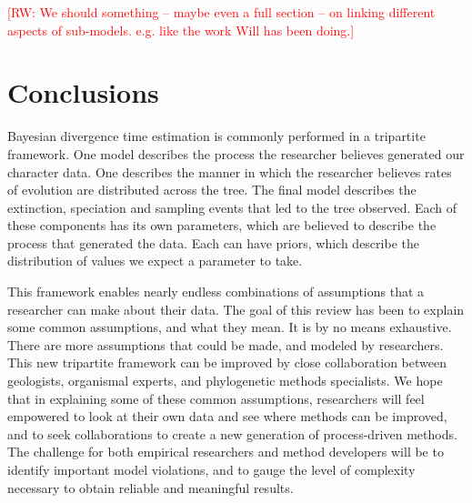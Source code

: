 \documentclass[11pt]{article}
\newcommand{\rw}[1]{{\textcolor{red}{[RW: #1]}}} %
\begin{document}
\rw{We should something -- maybe even a full section -- on linking different aspects of sub-models. e.g. like the work Will has been doing.}

\section{Conclusions}

Bayesian divergence time estimation is commonly performed in a tripartite framework.
One model describes the process the researcher believes generated our character data.
One describes the manner in which the researcher believes rates of evolution are distributed across the tree.
The final model describes the extinction, speciation and sampling events that led to the tree observed.
Each of these components has its own parameters, which are believed to describe the process that generated the data.
Each can have priors, which describe the distribution of values we expect a parameter to take.


This framework enables nearly endless combinations of assumptions that a researcher can make about their data.
The goal of this review has been to explain some common assumptions, and what they mean. 
It is by no means exhaustive.
There are more assumptions that could be made, and modeled by researchers.
This new tripartite framework can be improved by close collaboration between geologists, organismal experts, and phylogenetic methods specialists. 
We hope that in explaining some of these common assumptions, researchers will feel empowered to look at their own data and see where methods can be improved, and to seek collaborations to create a new generation of process-driven methods. The challenge for both empirical researchers and method developers will be to identify important model violations, and to gauge the level of complexity necessary to obtain reliable and meaningful results.

\end{document}

